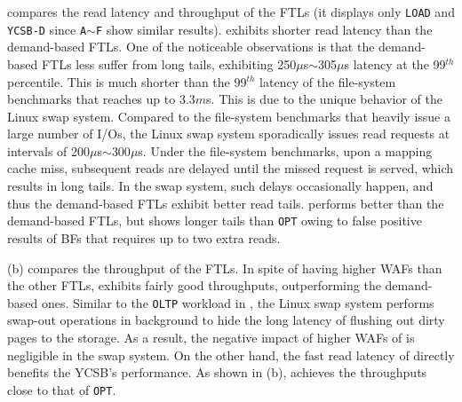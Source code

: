  compares the read latency and throughput of the
FTLs (it displays only \texttt{LOAD} and \texttt{YCSB-D} since \texttt{A$\sim$F} show similar 
results).
\texttt{\ours{}} exhibits
shorter read latency than the demand-based FTLs.
One of the noticeable
observations is that the demand-based FTLs less suffer from long tails,
exhibiting
250$\mu$s$\sim$305$\mu$s latency at the
99$^{th}$ percentile.  This is much shorter than the 99$^{th}$ latency of the
file-system benchmarks that reaches up to 3.3$m$s.  This is due to the
unique behavior of the Linux swap system.  Compared to the file-system
benchmarks that heavily issue a large number of I/Os, the Linux swap
system sporadically issues read requests at intervals of 200$\mu$s$\sim$300$\mu$s.
Under the file-system benchmarks, upon a mapping cache miss, subsequent reads
are delayed until the missed request is served, which results in long tails.
In the swap system, such delays occasionally happen, and thus the
demand-based FTLs exhibit better read tails.  \texttt{\ours{}} performs better than the
demand-based FTLs, but shows longer tails than \texttt{OPT} owing to
false positive results of BFs that requires up to two extra reads.


(b) compares the throughput of the FTLs.  In spite of
having higher WAFs than the other FTLs, \texttt{\ours{}} exhibits fairly good
throughputs, outperforming the demand-based ones.  Similar to the \texttt{OLTP} workload
in , the Linux swap system performs swap-out operations in background
to hide the long latency of flushing out dirty pages to the storage. As a
result, the negative impact of higher WAFs of \texttt{\ours{}} is negligible in the swap
system. On the other hand, the fast read latency of \texttt{\ours{}} directly benefits
the YCSB's performance. As shown in (b), \texttt{\ours{}} achieves
the throughputs close to that of \texttt{OPT}.

